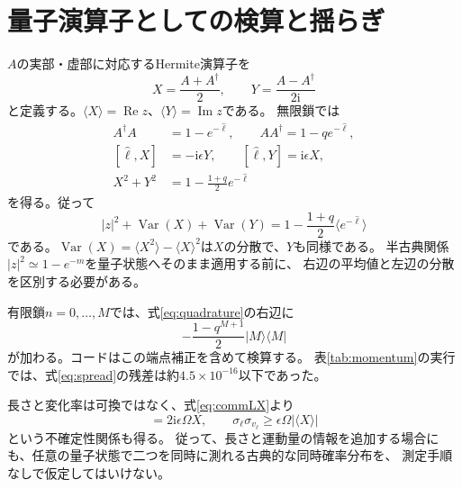 \documentclass[a4paper,11pt]{ltjsarticle}
\numberwithin{equation}{section}
\newcommand{\ket}[1]{\lvert #1\rangle}
\newcommand{\bra}[1]{\langle #1\rvert}
\newcommand{\ii}{\mathrm i}
\newcommand{\Var}{\operatorname{Var}}
\begin{document}
\section{量子演算子としての検算と揺らぎ}
$A$の実部・虚部に対応するHermite演算子を
\begin{equation}
 X=\frac{A+A^\dagger}{2},\qquad Y=\frac{A-A^\dagger}{2\ii}
 \label{eq:XY}
\end{equation}
と定義する。$\langle X\rangle=\operatorname{Re}z$、$\langle Y\rangle=\operatorname{Im}z$である。
無限鎖では
\begin{align}
 A^\dagger A&=1-e^{-\hat\ell},\qquad AA^\dagger=1-qe^{-\hat\ell},
 \label{eq:AA}\\
 [\hat\ell,X]&=-\ii\epsilon Y,\qquad
 [\hat\ell,Y]=\ii\epsilon X,
 \label{eq:commLX}\\
 X^2+Y^2&=1-\frac{1+q}{2}e^{-\hat\ell}
 \label{eq:quadrature}
\end{align}
を得る。従って
\begin{equation}
 |z|^2+\Var(X)+\Var(Y)
 =1-\frac{1+q}{2}\langle e^{-\hat\ell}\rangle
 \label{eq:spread}
\end{equation}
である。$\Var(X)=\langle X^2\rangle-\langle X\rangle^2$は$X$の分散で、$Y$も同様である。
半古典関係$|z|^2\simeq1-e^{-m}$を量子状態へそのまま適用する前に、
右辺の平均値と左辺の分散を区別する必要がある。

有限鎖$n=0,\ldots,M$では、式\eqref{eq:quadrature}の右辺に
\begin{equation}
 -\frac{1-q^{M+1}}{2}\ket M\bra M
 \label{eq:endpoint}
\end{equation}
が加わる。コードはこの端点補正を含めて検算する。
表\ref{tab:momentum}の実行では、式\eqref{eq:spread}の残差は約$4.5\times10^{-16}$以下であった。

長さと変化率は可換ではなく、式\eqref{eq:commLX}より
\begin{equation}
 [\hat\ell,\hat v_\ell]=2\ii\epsilon\Omega X,
 \qquad \sigma_\ell\sigma_{v_\ell}\geq\epsilon\Omega|\langle X\rangle|
 \label{eq:uncertainty}
\end{equation}
という不確定性関係も得る。
従って、長さと運動量の情報を追加する場合にも、任意の量子状態で二つを同時に測れる古典的な同時確率分布を、
測定手順なしで仮定してはいけない。
\end{document}
